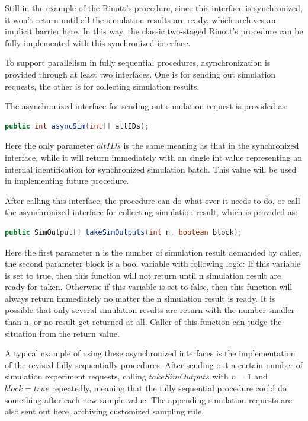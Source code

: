 Still in the example of the Rinott's procedure, since this interface is synchronized, it won't return until all the simulation results are ready, which archives an implicit barrier here. In this way, the classic two-staged Rinott's procedure can be fully implemented with this synchronized interface.

To support parallelism in fully sequential procedures, asynchronization is provided through at least two interfaces. One is for sending out simulation requests, the other is for collecting simulation results.

The asynchronized interface for sending out simulation request is provided as:

\begin{lstlisting}[language=Java]
public int asyncSim(int[] altIDs);
\end{lstlisting}

Here the only parameter $altIDs$ is the same meaning as that in the synchronized interface, while it will return immediately with an single int value representing an internal identification for synchronized simulation batch. This value will be used in implementing future procedure.

After calling this interface, the procedure can do what ever it needs to do, or call the asynchronized interface for collecting simulation result, which is provided as:

\begin{lstlisting}[language=Java]
public SimOutput[] takeSimOutputs(int n, boolean block);
\end{lstlisting}

Here the first parameter n is the number of simulation result demanded by caller, the second parameter block is a bool variable with following logic: If this variable is set to true, then this function will not return until n simulation result are ready for taken. Otherwise if this variable  is set to false, then this function will always return immediately no matter the n simulation result is ready. It is possible that only several simulation results are return with the number smaller than n, or no result get returned at all. Caller of this function can judge the situation from the return value.

A typical example of using these asynchronized interfaces is the implementation of the revised fully sequentially procedures. After sending out a certain number of simulation experiment requests, calling $takeSimOutputs$ with $n = 1$ and $block = true$ repeatedly, meaning that the fully sequential procedure could do something after each new sample value. The appending simulation requests are also sent out here, archiving customized sampling rule.

